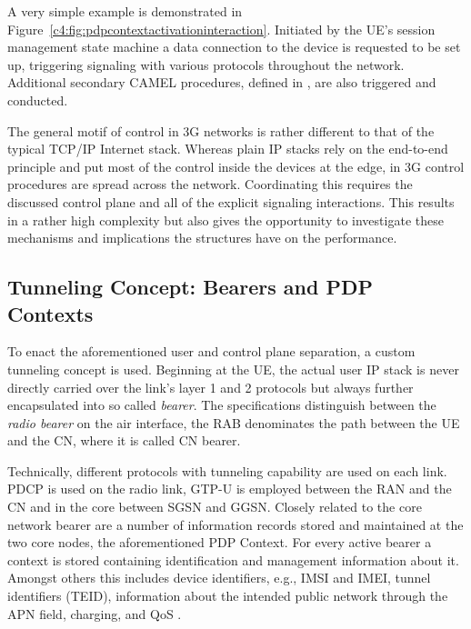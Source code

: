 A very simple example is demonstrated in Figure~\ref{c4:fig:pdpcontextactivationinteraction}. Initiated by the \gls{UE}'s session management state machine a data connection to the device is requested to be set up, triggering signaling with various protocols throughout the network. Additional secondary \gls{CAMEL} procedures, defined in \cite{3gpp.23.078}, are also triggered and conducted.

The general motif of control in \gls{3G} networks is rather different to that of the typical \gls{TCP}/\gls{IP} Internet stack. Whereas plain \gls{IP} stacks rely on the end-to-end principle and put most of the control inside the devices at the edge, in \gls{3G} control procedures are spread across the network. Coordinating this requires the discussed control plane and all of the explicit signaling interactions. This results in a rather high complexity but also gives the opportunity to investigate these mechanisms and implications the structures have on the performance.


\subsection{Tunneling Concept: Bearers and \texorpdfstring{\acrshort{PDP}}{PDP} Contexts}

To enact the aforementioned user and control plane separation, a custom tunneling concept is used. Beginning at the \gls{UE}, the actual user \gls{IP} stack is never directly carried over the link's layer 1 and 2 protocols but always further encapsulated into so called \textit{bearer}. The specifications distinguish between the \textit{radio bearer} on the air interface, the \gls{RAB} denominates the path between the \gls{UE} and the \gls{CN}, where it is called \gls{CN} bearer.

Technically, different protocols with tunneling capability are used on each link. \gls{PDCP} is used on the radio link, \gls{GTP-U} is employed between the \gls{RAN} and the \gls{CN} and in the core between \gls{SGSN} and \gls{GGSN}. Closely related to the core network bearer are a number of information records stored and maintained at the two core nodes, the aforementioned \gls{PDP} Context. For every active bearer a context is stored containing identification and management information about it. Amongst others this includes device identifiers, e.g., \gls{IMSI} and \gls{IMEI}, tunnel identifiers (\gls{TEID}), information about the intended public network through the \gls{APN} field, charging, and \gls{QoS} \cite[Section~13]{3gpp.23.060}.

